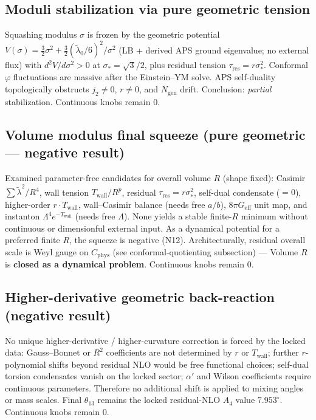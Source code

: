 \documentclass{article}
\begin{document}
\subsection{Moduli stabilization via pure geometric tension}
Squashing modulus $\sigma$ is frozen by the geometric potential
$V(\sigma)=\tfrac32\sigma^2+\tfrac32(\tilde\lambda_0/6)^2/\sigma^2$ (LB + derived
APS ground eigenvalue; no external flux) with $d^2V/d\sigma^2>0$ at $\sigma_*=\sqrt3/2$,
plus residual tension $\tau_{\mathrm{res}}=r\sigma_*^2$. Conformal $\varphi$ fluctuations
are massive after the Einstein--YM solve. APS self-duality topologically obstructs
$j_2\neq 0$, $r\neq 0$, and $N_{\mathrm{gen}}$ drift. Conclusion: \emph{partial}
stabilization. Continuous knobs remain 0.

\subsection{Volume modulus final squeeze (pure geometric --- negative result)}
Examined parameter-free candidates for overall volume $R$ (shape fixed):
Casimir $\sum\tilde\lambda^2/R^4$, wall tension $T_{\mathrm{wall}}/R^p$, residual
$\tau_{\mathrm{res}}=r\sigma_*^2$, self-dual condensate ($=0$), higher-order
$r\cdot T_{\mathrm{wall}}$, wall--Casimir balance (needs free $a/b$),
$8\pi G_{\mathrm{eff}}$ unit map, and instanton $\Lambda^4 e^{-T_{\mathrm{wall}}}$
(needs free $\Lambda$). None yields a stable finite-$R$ minimum without continuous
or dimensionful external input. As a dynamical potential for a preferred finite $R$, the squeeze is negative (N12). Architecturally, residual overall scale is Weyl gauge on $C_{\mathrm{phys}}$ (see conformal-quotienting subsection) --- Volume $R$ is \textbf{closed as a dynamical problem}.
Continuous knobs remain 0.

\subsection{Higher-derivative geometric back-reaction (negative result)}
No unique higher-derivative / higher-curvature correction is forced by the locked
data: Gauss--Bonnet or $R^2$ coefficients are not determined by $r$ or $T_{\mathrm{wall}}$;
further $r$-polynomial shifts beyond residual NLO would be free functional choices;
self-dual torsion condensates vanish on the locked sector; $\alpha'$ and Wilson
coefficients require continuous parameters. Therefore no additional shift is applied
to mixing angles or mass scales. Final $\theta_{13}$ remains the locked residual-NLO
$A_4$ value $7.953^\circ$. Continuous knobs remain 0.
\end{document}
